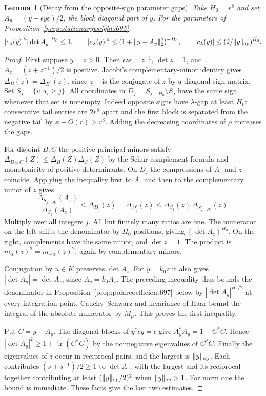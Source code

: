 \documentclass[a4paper,11pt]{article}
\newtheorem{lemma}[proposition]{Lemma}
\theoremstyle{definition}
\theoremstyle{remark}
\numberwithin{equation}{section}
\begin{document}
\begin{lemma}[Decay from the opposite-sign parameter gaps]\leavevmode
\label{lem:coefficientdecay697}
Take \(H_0=r^8\) and set \(A_y=(y+\epsilon y\epsilon)/2\),
the block diagonal part of \(y\). For the parameters of
Proposition~\ref{prop:stationaryweights695},
\[
       |c_\lambda(y)|^2|\det A_y|^{H_0}\le1,\qquad
       |c_\lambda(y)|^4\le(1+\|y-A_y\|_2^2)^{-H_0},\qquad
       |c_\lambda(y)|\le (2/\|y\|_{\rm op})^{H_0}.
\]
\end{lemma}
\begin{proof}
First suppose \(y=z>0\). Then \(\epsilon z\epsilon=z^{-1}\),
\(\det z=1\), and \(A_z=(z+z^{-1})/2\) is positive.
Jacobi's complementary-minor identity gives
\(\Delta_B(z)=\Delta_{B^c}(z)\), since \(z^{-1}\) is the
conjugate of \(z\) by a diagonal sign matrix. Set
\(S_j=\{i:\alpha_i\ge j\}\). All coordinates in
\(D_j=S_{j-H_0}\setminus S_j\) have the same sign whenever
that set is nonempty. Indeed opposite signs have
\(\lambda\)-gap at least \(H_0\): consecutive tail entries
are \(2r^8\) apart and the first block is separated from the
negative tail by \(\kappa-O(r)>r^8\). Adding the decreasing
coordinates of \(\rho\) increases the gaps.

For disjoint \(B,C\) the positive principal minors satisfy
\(\Delta_{B\cup C}(Z)\le\Delta_B(Z)\Delta_C(Z)\) by the
Schur complement formula and monotonicity of positive
determinants. On \(D_j\) the compressions of \(A_z\) and
\(z\) coincide. Applying the inequality first to \(A_z\)
and then to the complementary minor of \(z\) gives
\[
 \frac{\Delta_{S_{j-H_0}}(A_z)}{\Delta_{S_j}(A_z)}
 \le\Delta_{D_j}(z)
 =\Delta_{D_j^c}(z)
 \le\Delta_{S_j}(z)\,\Delta_{S_{j-H_0}^c}(z).
\]
Multiply over all integers \(j\). All but finitely many
ratios are one. The numerator on the left shifts the
denominator by \(H_0\) positions, giving \((\det A_z)^{H_0}\).
On the right, complements have the same minor, and
\(\det z=1\). The product is \(m_\alpha(z)^2
=m_{-\alpha}(z)^2\), again by complementary minors.

Conjugation by \(u\in K\) preserves \(\det A_z\).
For \(y=k_0z\) it also gives
\(|\det A_y|=\det A_z\), since \(A_y=k_0A_z\).
The preceding inequality thus bounds the denominator in
Proposition~\ref{prop:polarcoefficient697} below by
\(|\det A_y|^{H_0/2}\) at every integration point.
Cauchy--Schwarz and invariance of Haar bound the integral
of the absolute numerator by \(M_\mu\). This proves the
first inequality.

Put \(C=y-A_y\). The diagonal blocks of
\(y^*\epsilon y=\epsilon\) give \(A_y^*A_y=1+C^*C\).
Hence \(|\det A_y|^2\ge 1+\operatorname{tr}(C^*C)\) by
the nonnegative eigenvalues of \(C^*C\). Finally the
eigenvalues of \(z\) occur in reciprocal pairs, and the
largest is \(\|y\|_{\rm op}\). Each contributes
\((s+s^{-1})/2\ge1\) to \(\det A_z\), with the largest and
its reciprocal together contributing at least
\((\|y\|_{\rm op}/2)^2\) when \(\|y\|_{\rm op}>1\).
For norm one the bound is immediate. These facts give the
last two estimates.
\end{proof}
\end{document}
